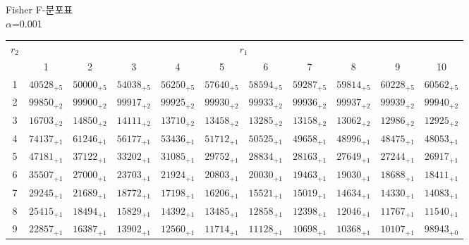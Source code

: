 \documentclass[10pt, a4paper]{article}
\begin{document}
\begin{center}
    \huge{Fisher F-분포표}\normalsize\\
    
    \(\alpha\)=0.001

    \begin{tabular}{c || c c c c c | c c c c c}
        \multirow{2}{*}{\(r_2\)} & \multicolumn{10}{c}{\(r_1\)} \\
        & 1 & 2 & 3 & 4 & 5 & 6 & 7 & 8 & 9 & 10\\
        \hline\hline
        1 & \({40528}_{+5}\) & \({50000}_{+5}\) & \({54038}_{+5}\) & \({56250}_{+5}\) & \({57640}_{+5}\) & \({58594}_{+5}\) & \({59287}_{+5}\) & \({59814}_{+5}\) & \({60228}_{+5}\) & \({60562}_{+5}\)\\
        2 & \({99850}_{+2}\) & \({99900}_{+2}\) & \({99917}_{+2}\) & \({99925}_{+2}\) & \({99930}_{+2}\) & \({99933}_{+2}\) & \({99936}_{+2}\) & \({99937}_{+2}\) & \({99939}_{+2}\) & \({99940}_{+2}\)\\
        3 & \({16703}_{+2}\) & \({14850}_{+2}\) & \({14111}_{+2}\) & \({13710}_{+2}\) & \({13458}_{+2}\) & \({13285}_{+2}\) & \({13158}_{+2}\) & \({13062}_{+2}\) & \({12986}_{+2}\) & \({12925}_{+2}\)\\
        4 & \({74137}_{+1}\) & \({61246}_{+1}\) & \({56177}_{+1}\) & \({53436}_{+1}\) & \({51712}_{+1}\) & \({50525}_{+1}\) & \({49658}_{+1}\) & \({48996}_{+1}\) & \({48475}_{+1}\) & \({48053}_{+1}\)\\
        5 & \({47181}_{+1}\) & \({37122}_{+1}\) & \({33202}_{+1}\) & \({31085}_{+1}\) & \({29752}_{+1}\) & \({28834}_{+1}\) & \({28163}_{+1}\) & \({27649}_{+1}\) & \({27244}_{+1}\) & \({26917}_{+1}\)\\
        \hline
        6 & \({35507}_{+1}\) & \({27000}_{+1}\) & \({23703}_{+1}\) & \({21924}_{+1}\) & \({20803}_{+1}\) & \({20030}_{+1}\) & \({19463}_{+1}\) & \({19030}_{+1}\) & \({18688}_{+1}\) & \({18411}_{+1}\)\\
        7 & \({29245}_{+1}\) & \({21689}_{+1}\) & \({18772}_{+1}\) & \({17198}_{+1}\) & \({16206}_{+1}\) & \({15521}_{+1}\) & \({15019}_{+1}\) & \({14634}_{+1}\) & \({14330}_{+1}\) & \({14083}_{+1}\)\\
        8 & \({25415}_{+1}\) & \({18494}_{+1}\) & \({15829}_{+1}\) & \({14392}_{+1}\) & \({13485}_{+1}\) & \({12858}_{+1}\) & \({12398}_{+1}\) & \({12046}_{+1}\) & \({11767}_{+1}\) & \({11540}_{+1}\)\\
        9 & \({22857}_{+1}\) & \({16387}_{+1}\) & \({13902}_{+1}\) & \({12560}_{+1}\) & \({11714}_{+1}\) & \({11128}_{+1}\) & \({10698}_{+1}\) & \({10368}_{+1}\) & \({10107}_{+1}\) & \({98943}_{+0}\)\\

\end{tabular}
\end{center}
\end{document}
